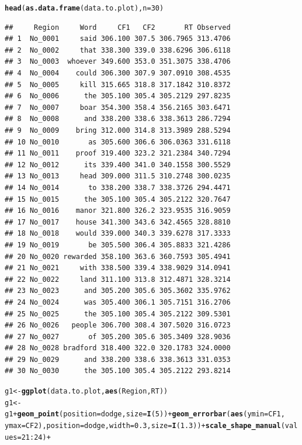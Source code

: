 \documentclass{article}\usepackage[]{graphicx}\usepackage[]{color}
\makeatletter
\newcommand{\hlnum}[1]{\textcolor[rgb]{0.686,0.059,0.569}{#1}}%
\newcommand{\hlopt}[1]{\textcolor[rgb]{0,0,0}{#1}}%
\newcommand{\hlstd}[1]{\textcolor[rgb]{0.345,0.345,0.345}{#1}}%
\newcommand{\hlkwb}[1]{\textcolor[rgb]{0.69,0.353,0.396}{#1}}%
\newcommand{\hlkwc}[1]{\textcolor[rgb]{0.333,0.667,0.333}{#1}}%
\newcommand{\hlkwd}[1]{\textcolor[rgb]{0.737,0.353,0.396}{\textbf{#1}}}%
\newenvironment{kframe}{%
 \def\at@end@of@kframe{}%
 \ifinner\ifhmode%
  \def\at@end@of@kframe{\end{minipage}}%
  \begin{minipage}{\columnwidth}%
 \fi\fi%
 \def\FrameCommand##1{\hskip\@totalleftmargin \hskip-\fboxsep
 \colorbox{shadecolor}{##1}\hskip-\fboxsep
     \hskip-\linewidth \hskip-\@totalleftmargin \hskip\columnwidth}%
 \MakeFramed {\advance\hsize-\width
   \@totalleftmargin\z@ \linewidth\hsize
   \@setminipage}}%
 {\par\unskip\endMakeFramed%
 \at@end@of@kframe}
\newenvironment{knitrout}{}{} %
\makeatother
\begin{document}
\begin{knitrout}
\begin{kframe}
\begin{alltt}
\hlkwd{head}\hlstd{(}\hlkwd{as.data.frame}\hlstd{(data.to.plot),} \hlkwc{n} \hlstd{=} \hlnum{30}\hlstd{)}
\end{alltt}
\begin{verbatim}
##     Region     Word     CF1   CF2       RT Observed
## 1  No_0001     said 306.100 307.5 306.7965 313.4706
## 2  No_0002     that 338.300 339.0 338.6296 306.6118
## 3  No_0003  whoever 349.600 353.0 351.3075 338.4706
## 4  No_0004    could 306.300 307.9 307.0910 308.4535
## 5  No_0005     kill 315.665 318.8 317.1842 310.8372
## 6  No_0006      the 305.100 305.4 305.2129 297.8235
## 7  No_0007     boar 354.300 358.4 356.2165 303.6471
## 8  No_0008      and 338.200 338.6 338.3613 286.7294
## 9  No_0009    bring 312.000 314.8 313.3989 288.5294
## 10 No_0010       as 305.600 306.6 306.0363 331.6118
## 11 No_0011    proof 319.400 323.2 321.2384 340.7294
## 12 No_0012      its 339.400 341.0 340.1558 300.5529
## 13 No_0013     head 309.000 311.5 310.2748 300.0235
## 14 No_0014       to 338.200 338.7 338.3726 294.4471
## 15 No_0015      the 305.100 305.4 305.2122 320.7647
## 16 No_0016    manor 321.800 326.2 323.9535 316.9059
## 17 No_0017    house 341.300 343.6 342.4565 328.8810
## 18 No_0018    would 339.000 340.3 339.6278 317.3333
## 19 No_0019       be 305.500 306.4 305.8833 321.4286
## 20 No_0020 rewarded 358.100 363.6 360.7593 305.4941
## 21 No_0021     with 338.500 339.4 338.9029 314.0941
## 22 No_0022     land 311.100 313.8 312.4871 328.3214
## 23 No_0023      and 305.200 305.6 305.3602 335.9762
## 24 No_0024      was 305.400 306.1 305.7151 316.2706
## 25 No_0025      the 305.100 305.4 305.2122 309.5301
## 26 No_0026   people 306.700 308.4 307.5020 316.0723
## 27 No_0027       of 305.200 305.6 305.3409 328.9036
## 28 No_0028 bradford 318.400 322.0 320.1783 324.0000
## 29 No_0029      and 338.200 338.6 338.3613 331.0353
## 30 No_0030      the 305.100 305.4 305.2122 293.8214
\end{verbatim}
\begin{alltt}
\hlstd{g1} \hlkwb{<-} \hlkwd{ggplot}\hlstd{(data.to.plot,} \hlkwd{aes}\hlstd{(Region, RT))}
\hlstd{g1} \hlkwb{<-} \hlstd{g1} \hlopt{+} \hlkwd{geom_point}\hlstd{(}\hlkwc{position} \hlstd{= dodge,} \hlkwc{size} \hlstd{=} \hlkwd{I}\hlstd{(}\hlnum{5}\hlstd{))} \hlopt{+} \hlkwd{geom_errorbar}\hlstd{(}\hlkwd{aes}\hlstd{(}\hlkwc{ymin} \hlstd{= CF1,}
    \hlkwc{ymax} \hlstd{= CF2),} \hlkwc{position} \hlstd{= dodge,} \hlkwc{width} \hlstd{=} \hlnum{0.3}\hlstd{,} \hlkwc{size} \hlstd{=} \hlkwd{I}\hlstd{(}\hlnum{1.3}\hlstd{))} \hlopt{+} \hlkwd{scale_shape_manual}\hlstd{(}\hlkwc{values} \hlstd{=} \hlnum{21}\hlopt{:}\hlnum{24}\hlstd{)} \hlopt{+}

\end{alltt}
\end{kframe}
\end{knitrout}
\end{document}
